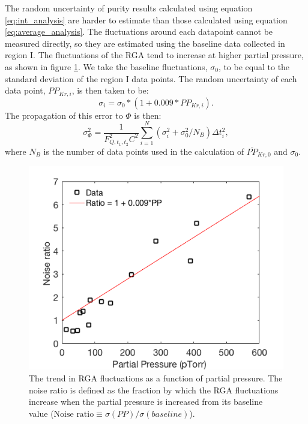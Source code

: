\documentclass[12pt]{article}
\begin{document}
The random uncertainty of purity results calculated using equation \ref{eq:int_analysis} are harder to estimate than those calculated using equation \ref{eq:average_analysis}. The fluctuations around each datapoint cannot be measured directly, so they are estimated using the baseline data collected in region I. The fluctuations of the RGA tend to increase at higher partial pressure, as shown in figure \ref{fig:RGAnoise}. We take the baseline fluctuations, $\sigma_0$, to be equal to the standard deviation of the region I data points. The random uncertainty of each data point, $PP_{Kr,i}$, is then taken to be:
{\color{red}
\begin{equation}
\label{eq:preserr}
\sigma_i=\sigma_{0}*(1+0.009*PP_{Kr,i}).
\end{equation}}
The propagation of this error to $\Phi$ is then:
\begin{equation}
\sigma_{\Phi}^2=\frac{1}{F_{Q,t_1,t_2}^2C^2}\sum_{i=1}^{N}(\sigma_i^2+\sigma_0^2/N_B)\Delta t_i^2,
\end{equation}
where $N_B$ is the number of data points used in the calculation of $\overline{PP}_{Kr,0}$ and $\sigma_0$.
\begin{figure}[h!]
  \includegraphics[width=\linewidth]{Figures/RGA_Noise_v_PP.png}
  \caption{The trend in RGA fluctuations as a function of partial pressure. The noise ratio is defined as the fraction by which the RGA fluctuations increase when the partial pressure is increased from its baseline value ($\textrm{Noise ratio} \equiv \sigma(PP)/\sigma(baseline)$). }
  \label{fig:RGAnoise}
\end{figure}
\end{document}
